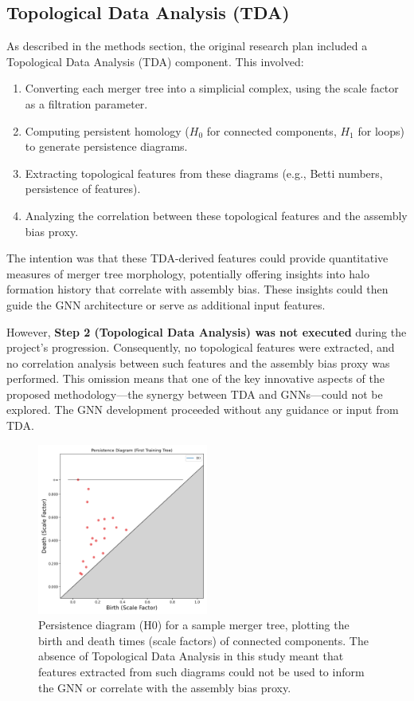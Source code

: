 \documentclass[twocolumn]{aastex631}
\begin{document}
\subsection{Topological Data Analysis (TDA)}

As described in the methods section, the original research plan included a Topological Data Analysis (TDA) component. This involved:
\begin{enumerate}
    \item Converting each merger tree into a simplicial complex, using the scale factor as a filtration parameter.
    \item Computing persistent homology ($H_0$ for connected components, $H_1$ for loops) to generate persistence diagrams.
    \item Extracting topological features from these diagrams (e.g., Betti numbers, persistence of features).
    \item Analyzing the correlation between these topological features and the assembly bias proxy.
\end{enumerate}

The intention was that these TDA-derived features could provide quantitative measures of merger tree morphology, potentially offering insights into halo formation history that correlate with assembly bias. These insights could then guide the GNN architecture or serve as additional input features.

However, \textbf{Step 2 (Topological Data Analysis) was not executed} during the project's progression. Consequently, no topological features were extracted, and no correlation analysis between such features and the assembly bias proxy was performed. This omission means that one of the key innovative aspects of the proposed methodology—the synergy between TDA and GNNs—could not be explored. The GNN development proceeded without any guidance or input from TDA.

\begin{figure}[htbp]
    \centering
    \includegraphics[width=0.5\textwidth]{../input_files/plots/persistence_diagram_1_1748137556.png}
    \caption{\label{fig:persistence_diagram_h0}Persistence diagram (H0) for a sample merger tree, plotting the birth and death times (scale factors) of connected components. The absence of Topological Data Analysis in this study meant that features extracted from such diagrams could not be used to inform the GNN or correlate with the assembly bias proxy.}
\end{figure}
\end{document}

